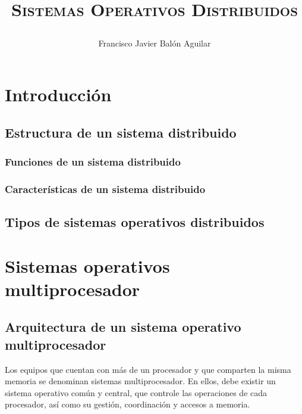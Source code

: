 \documentclass[a4paper, 11pt, titlepage]{article}
\title{{\scshape\Huge Sistemas Operativos Distribuidos \par}}
\author{Francisco Javier Balón Aguilar}
\begin{document}
\maketitle
\renewcommand{\contentsname}{Índice de contenidos} %
\tableofcontents %

\listoffigures

\listoftables
\newpage

\section{Introducción}

    \subsection{Estructura de un sistema distribuido}

        \subsubsection{Funciones de un sistema distribuido}

        \subsubsection{Características de un sistema distribuido}

    \subsection{Tipos de sistemas operativos distribuidos}

\section{Sistemas operativos multiprocesador}

    \subsection{Arquitectura de un sistema operativo multiprocesador}

        Los equipos que cuentan con más de un procesador y que comparten la misma memoria
        se denominan sistemas multiprocesador. En ellos, debe existir un sistema operativo 
        común y central, que controle las operaciones de cada procesador, así como su 
        gestión, coordinación y accesos a memoria.
\end{document}
